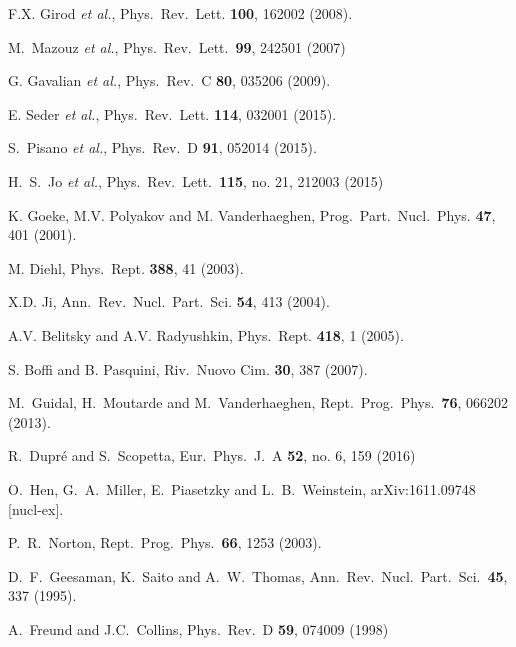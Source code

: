 \documentclass[twocolumn,nofootinbib,showpacs,prl,superscriptaddress,secnumarabic,amssymb,nobibnotes,aps,floatfix]{revtex4}
\begin{document}
\begin{thebibliography}{99}
F.X. Girod {\it et al.},
Phys.\ Rev.\ Lett. {\bf 100}, 162002 (2008).

   M.~Mazouz {\it et al.},
   Phys.\ Rev.\ Lett.\  {\bf 99}, 242501 (2007)

G. Gavalian {\it et al.},
Phys.\ Rev.\ C {\bf 80}, 035206 (2009).

E. Seder {\it et al.},
Phys.\ Rev.\ Lett. {\bf 114}, 032001 (2015).

S.~Pisano {\it et al.},
Phys.\ Rev.\ D {\bf 91}, 052014 (2015).

H.~S.~Jo {\it et al.},
  Phys.\ Rev.\ Lett.\  {\bf 115}, no. 21, 212003 (2015)

K. Goeke, M.V. Polyakov and M. Vanderhaeghen,
Prog.\ Part.\ Nucl.\ Phys. {\bf 47}, 401 (2001).

M. Diehl,
Phys.\ Rept.  {\bf 388}, 41 (2003).

X.D. Ji,
Ann.\ Rev.\ Nucl.\ Part.\ Sci. {\bf 54}, 413 (2004).

A.V. Belitsky and A.V. Radyushkin,
Phys.\ Rept. {\bf 418}, 1 (2005).

 S. Boffi and B. Pasquini,
Riv.\ Nuovo Cim. {\bf 30}, 387 (2007).

M.~Guidal, H.~Moutarde and M.~Vanderhaeghen,
Rept.\ Prog.\ Phys.\  {\bf 76}, 066202 (2013).

  R.~Dupr\'e and S.~Scopetta,
  Eur.\ Phys.\ J.\ A {\bf 52}, no. 6, 159 (2016)

  O.~Hen, G.~A.~Miller, E.~Piasetzky and L.~B.~Weinstein,
  arXiv:1611.09748 [nucl-ex].

  P.~R.~Norton,
  Rept.\ Prog.\ Phys.\  {\bf 66}, 1253 (2003).

  D.~F.~Geesaman, K.~Saito and A.~W.~Thomas,
  Ann.\ Rev.\ Nucl.\ Part.\ Sci.\  {\bf 45}, 337 (1995).

A.~Freund and J.C.~Collins, 
Phys.\ Rev.\ D {\bf 59}, 074009 (1998)


\end{thebibliography}
\end{document}
